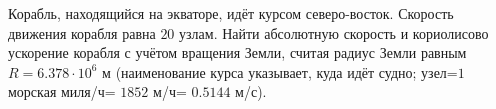 Корабль, находящийся на экваторе, идёт курсом северо-восток. Скорость
движения корабля равна $20$ узлам. Найти абсолютную скорость и
кориолисово ускорение корабля с учётом вращения Земли, считая радиус
Земли равным $R=6.378\cdot10^6$ м (наименование курса указывает, куда
идёт судно; узел=$1$ морская миля/ч= $1852$ м/ч= $0.5144$ м/с).
